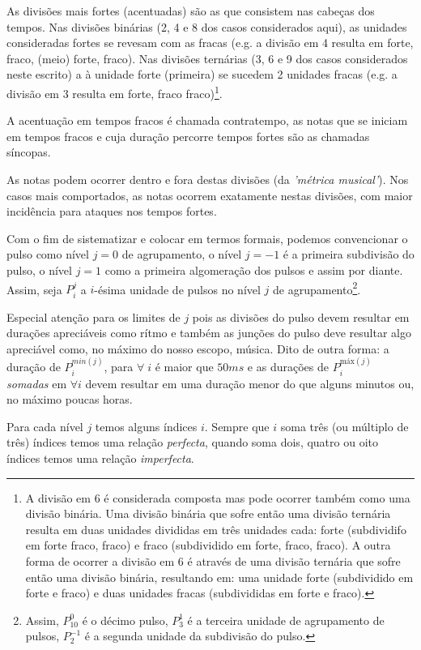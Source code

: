 As divisões mais fortes (acentuadas) são as que consistem nas cabeças dos tempos. Nas divisões binárias (2, 4 e 8 dos casos considerados aqui),
as unidades consideradas fortes se revesam com as fracas
(e.g. a divisão em 4 resulta em forte, fraco, (meio) forte, fraco).
Nas divisões ternárias (3, 6 e 9 dos casos considerados neste escrito) a
à unidade forte (primeira) se sucedem 2 unidades fracas (e.g. a divisão em 3 resulta em forte, fraco fraco)\footnote{A divisão em 6 é considerada composta
 mas pode ocorrer também como uma divisão binária.
 Uma divisão binária que sofre então uma divisão ternária
 resulta em duas unidades divididas em três unidades cada: forte (subdividifo em forte fraco, fraco) e fraco (subdividido em forte, fraco, fraco).
A outra forma de ocorrer a divisão em 6 é através de 
uma divisão ternária que sofre então uma divisão binária, resultando em:
uma unidade forte (subdividido em forte e fraco) e duas unidades fracas (subdivididas em forte e fraco).}.

A acentuação em tempos fracos é chamada contratempo, as notas que se iniciam em tempos fracos e cuja duração percorre tempos fortes são as chamadas síncopas.

As notas podem ocorrer dentro e fora destas divisões (da \emph{'métrica musical'}). Nos casos mais comportados, as notas ocorrem exatamente nestas divisões, com maior incidência para ataques nos tempos fortes.

Com o fim de sistematizar e colocar em termos formais, podemos convencionar
o pulso como nível $j=0$ de agrupamento, o nível $j=-1$ 
é a primeira subdivisão do pulso, o nível $j=1$ como a primeira algomeração dos pulsos e assim por diante. 
Assim, seja $P_i^j$ a $i$-ésima unidade de 
pulsos no nível $j$ de agrupamento\footnote{Assim,
$P^0_{10}$ é o décimo pulso, $P^{1}_3$ é a terceira unidade de agrupamento de pulsos,
$P^{-1}_2$ é a segunda unidade da subdivisão do pulso.}.


Especial atenção para
os limites de $j$ pois as divisões do pulso devem resultar em durações apreciáveis
como rítmo e também as junções do pulso deve resultar algo apreciável como, no máximo
do nosso escopo, música. Dito de outra forma: a duração de $P^{min(j)}_i$, para $\forall \; i$
é maior que $50ms$ e as durações de $P^{\text{máx}(j)}_i$ \emph{somadas}  em $\forall i$
devem resultar em uma duração menor do que alguns minutos ou, no máximo poucas horas.


Para cada nível $j$ temos alguns índices $i$. Sempre que $i$ soma três 
(ou múltiplo de três) índices temos uma relação \emph{perfecta}, 
quando soma dois, quatro ou oito índices temos uma relação \emph{imperfecta}.


